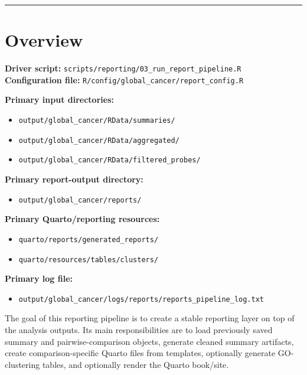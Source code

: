 \documentclass[
  letterpaper,
  DIV=11,
  numbers=noendperiod,
  openany,
  oneside]{scrreprt}
\providecommand{\tightlist}{%
  \setlength{\itemsep}{0pt}\setlength{\parskip}{0pt}}
\begin{document}
\begin{center}\rule{0.5\linewidth}{0.5pt}\end{center}

\section*{Overview}\label{overview-5}


\textbf{Driver script:}
\texttt{scripts/reporting/03\_run\_report\_pipeline.R}\\
\textbf{Configuration file:}
\texttt{R/config/global\_cancer/report\_config.R}

\textbf{Primary input directories:}

\begin{itemize}
\tightlist
\item
  \texttt{output/global\_cancer/RData/summaries/}
\item
  \texttt{output/global\_cancer/RData/aggregated/}
\item
  \texttt{output/global\_cancer/RData/filtered\_probes/}
\end{itemize}

\textbf{Primary report-output directory:}

\begin{itemize}
\tightlist
\item
  \texttt{output/global\_cancer/reports/}
\end{itemize}

\textbf{Primary Quarto/reporting resources:}

\begin{itemize}
\tightlist
\item
  \texttt{quarto/reports/generated\_reports/}
\item
  \texttt{quarto/resources/tables/clusters/}
\end{itemize}

\textbf{Primary log file:}

\begin{itemize}
\tightlist
\item
  \texttt{output/global\_cancer/logs/reports/reports\_pipeline\_log.txt}
\end{itemize}

The goal of this reporting pipeline is to create a stable reporting
layer on top of the analysis outputs. Its main responsibilities are to
load previously saved summary and pairwise-comparison objects, generate
cleaned summary artifacts, create comparison-specific Quarto files from
templates, optionally generate GO-clustering tables, and optionally
render the Quarto book/site.
\end{document}
